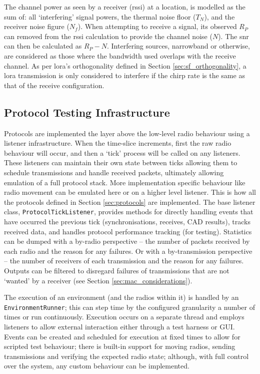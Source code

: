 The channel power as seen by a receiver (\ac{rssi}) at a location, is modelled as the sum of: all `interfering' signal powers, the thermal noise floor ($T_N$), and the receiver noise figure ($N_f$). When attempting to receive a signal, its observed $R_P$ can removed from the \ac{rssi} calculation to provide the channel noise ($N$). The \ac{snr} can then be calculated as $R_P - N$. Interfering sources, narrowband or otherwise, are considered as those where the bandwidth used overlaps with the receive channel. As per \ac{lora}'s orthogonality defined in Section \ref{sec:sf_orthogonality}, a \ac{lora} transmission is only considered to interfere if the chirp rate is the same as that of the receive configuration.


\subsection{Protocol Testing Infrastructure}
Protocols are implemented the layer above the low-level radio behaviour using a listener infrastructure. When the time-slice increments, first the raw radio behaviour will occur, and then a `tick' process will be called on any listeners. These listeners can maintain their own state between ticks allowing them to schedule transmissions and handle received packets, ultimately allowing emulation of a full protocol stack. More implementation specific behaviour like radio movement can be emulated here or on a higher level listener. This is how all the protocols defined in Section \ref{sec:protocols} are implemented. The base listener class, \texttt{ProtocolTickListener}, provides methods for directly handling events that have occurred the previous tick (synchronisations, receives, CAD results), tracks received data, and handles protocol performance tracking (for testing). Statistics can be dumped with a by-radio perspective -- the number of  packets received by each radio and the reason for any failures. Or with a by-transmission perspective -- the number of receivers of each transmission and the reason for any failures. Outputs can be filtered to disregard failures of transmissions that are not `wanted' by a receiver (see Section \ref{sec:mac_considerations}).

The execution of an environment (and the radios within it) is handled by an \texttt{EnvironmentRunner}; this can step time by the configured granularity a number of times or run continuously. Execution occurs on a separate thread and employs listeners to allow external interaction either through a test harness or GUI. Events can be created and scheduled for execution at fixed times to allow for scripted test behaviour; there is built-in support for moving radios, sending transmissions and verifying the expected radio state; although, with full control over the system, any custom behaviour can be implemented. 


